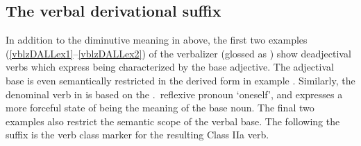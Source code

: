 \subsection{The verbal derivational suffix }\label{vblzDALL}
In addition to the diminutive meaning in  above, 
the first two examples \mbox{(\ref{vblzDALLex1}--\ref{vblzDALLex2})} of the verbalizer  (glossed as ) show deadjectival verbs which express being characterized by the base adjective. The adjectival base is even semantically restricted in the derived form in example . 
Similarly, the denominal verb in  is based on the \SGs.\NOMs\ reflexive pronoun  ‘oneself’, and expresses a more forceful state of being the meaning of the base noun. The final two examples also restrict the semantic scope of the verbal base. 
The  following the  suffix is the verb class marker for the resulting Class IIa verb. 
\ea\label{vblzDALLex1}
\z
\ea\label{vblzDALLex2}
\z
\ea\label{vblzDALLex3}
\z
\ea\label{vblzDALLex4}
\z
\ea\label{vblzDALLex5}
\z






